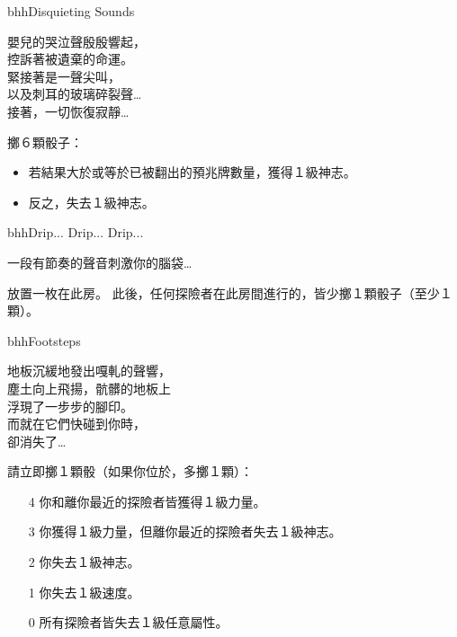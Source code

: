 \linebreak[0]%
\begin{EventCard}{bhh}{Disquieting Sounds}
	\begin{CardStory}
		嬰兒的哭泣聲殷殷響起，\\
		控訴著被遺棄的命運。\\
		緊接著是一聲尖叫，\\
		以及刺耳的玻璃碎裂聲…\\
		接著，一切恢復寂靜…
	\end{CardStory}
	擲６顆骰子：
	\begin{itemize}
		\item 若結果大於或等於已被翻出的預兆牌數量，獲得１級神志。
		\item 反之，失去１級神志。
	\end{itemize}
\end{EventCard}%
\linebreak[0]%
\begin{EventCard}{bhh}{Drip... Drip... Drip...}
	\begin{CardStory}
		一段有節奏的聲音刺激你的腦袋…
	\end{CardStory}
	放置一枚在此房。\smallbreak
	此後，任何探險者在此房間進行的，皆少擲１顆骰子（至少１顆）。\smallbreak
\end{EventCard}%
\linebreak[0]%
\begin{EventCard}{bhh}{Footsteps}
	\begin{CardStory}
		地板沉緩地發出嘎軋的聲響，\\
		塵土向上飛揚，骯髒的地板上\\
		浮現了一步步的腳印。\\
		而就在它們快碰到你時，\\
		卻消失了…
	\end{CardStory}
	請立即擲１顆骰（如果你位於，多擲１顆）：
	\begin{itemize}
		\item[4] 你和離你最近的探險者皆獲得１級力量。
		\item[3] 你獲得１級力量，但離你最近的探險者失去１級神志。
		\item[2] 你失去１級神志。
		\item[1] 你失去１級速度。
		\item[0] 所有探險者皆失去１級任意屬性。
	\end{itemize}
\end{EventCard}%
\linebreak[0]%
